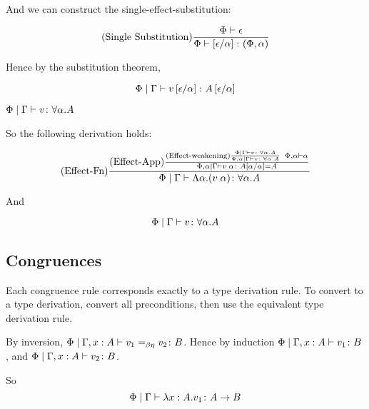 {        And we can construct the single-effect-substitution:

        \begin{equation}
            (\text{Single Substitution}) \frac{\Phi\vdash \epsilon}{\Phi \vdash \left[\epsilon / \alpha\right] \colon (\Phi,\alpha)}
        \end{equation}

        Hence by the substitution theorem,

        \begin{equation}
            \Phi\mid\Gamma \vdash v\left[\epsilon / \alpha\right] \colon A\left[\epsilon / \alpha\right]
        \end{equation}

    \bi $\Phi\mid\Gamma \vdash v \colon \forall \alpha. A$

    So the following derivation holds:

    \begin{equation}
        (\text{Effect-Fn}) \frac{
            (\text{Effect-App}) \frac{
                (\text{Effect-weakening}) \frac{
                    \Phi\mid\Gamma \vdash v \colon \forall \alpha. A
                }{
                    \Phi,\alpha\mid\Gamma \vdash v \colon \forall \alpha. A
                }
            \;\;
                \Phi,\alpha\vdash \alpha
            }{
                \Phi,\alpha\mid\Gamma \vdash v\;\alpha \colon A\left[\alpha / \alpha\right]=A
            }
        }{
            \Phi\mid\Gamma \vdash \Lambda \alpha. (v\;\alpha) \colon \forall \alpha. A
        }
    \end{equation}

    And 

    \begin{equation}
        \Phi\mid\Gamma \vdash v \colon \forall \alpha. A
    \end{equation}

        \subsection{Congruences}
    Each congruence rule corresponds exactly to a type derivation rule. To convert to a type derivation, convert all preconditions, then use the equivalent type derivation rule.

        By inversion, $\Phi\mid\Gamma, x: A \vdash v_1 =_{\beta\eta} v_2 \colon B$. Hence by induction $\Phi\mid\Gamma, x: A \vdash v_1 \colon B$, and $\Phi\mid\Gamma, x: A \vdash v_2 \colon B$.

        So 
        \begin{equation}
            \Phi\mid\Gamma \vdash \lambda x : A. v_1 \colon A\rightarrow B
        \end{equation}

}
